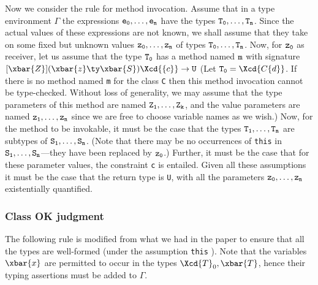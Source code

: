 Now we consider the rule for method invocation. Assume that in a type
environment $\Gamma$ the expressions ${\tt e_0}, \dots, {\tt e_n}$
have the types ${\tt T_0}, \dots, {\tt T_n}$.
Since the
actual values of these expressions are not known, we shall assume that
they take on some fixed but unknown values
                                     ${\tt z_0}, \dots, {\tt z_n}$
of types ${\tt T_0}, \dots, {\tt T_n}$.
Now, for ${\tt z_0}$ as receiver, let us assume that the type
${\tt T_0}$ has a method named ${\tt m}$
with signature
$[\xbar{Z}](\xbar{z} \ty \xbar{S})\Xcd{\{c\}} \to {\tt U}$
(Let ${\tt T_0} = \Xcd{C\{d\}}$.
 If there is no
method named {\tt m} for the class {\tt C} then this method invocation cannot be
type-checked. Without loss of generality, we may assume that the
type parameters of this method are named
                                     ${\tt Z_1}, \dots, {\tt Z_k}$, and
the value parameters are named
                                     ${\tt z_1}, \dots, {\tt z_n}$
since we are free to choose
variable names as we wish.)
Now, for the method to be invokable,
it must be the case that the types
    ${\tt T_1}, \dots, {\tt T_n}$
are subtypes of
    ${\tt S_1}, \dots, {\tt S_n}$.
(Note
that there may be no occurrences of {\tt this} in
    ${\tt S_1}, \dots, {\tt S_n}$---they have been
replaced by ${\tt z_0}$.)
Further, it must be the case that for these parameter
values, the constraint {\tt c} is entailed. Given all these assumptions it
must be the case that the return type is {\tt U}, with all the parameters
    ${\tt z_0}, \dots, {\tt z_n}$
existentially quantified.


\subsubsection{
        Class OK judgment
}

The following rule is modified from what we had in the paper to ensure
that all the types are well-formed (under the assumption {\tt this} ).
Note
that the variables $\xbar{x}$ are permitted to occur in the types $\Xcd{T}_0, \xbar{T}$,
hence their typing assertions must be added to $\Gamma$.



